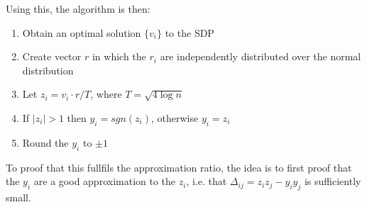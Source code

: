 Using this, the algorithm is then:

\begin{enumerate}
	\item Obtain an optimal solution $ \{v_i\} $ to the SDP
	\item Create vector $r$ in which the $r_i$ are independently distributed over the normal distribution
	\item Let $z_i=v_i\cdot r /T$, where $T=\sqrt{4\log n} $
	\item If $\left| z_i \right| > 1$ then $y_i=sgn(z_i)$, otherwise $y_i=z_i$
	\item Round the $y_i$ to $\pm 1$
\end{enumerate}
To proof that this fullfils the approximation ratio, the idea is to first proof that the $y_i$ are a good approximation to the $z_i$, i.e. that $\Delta_{ij}=z_iz_j-y_iy_j$ is sufficiently small.
